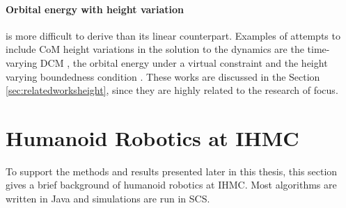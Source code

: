 \paragraph{Orbital energy with height variation}\label{subsec:nonorbit} is more difficult to derive than its linear counterpart.  Examples of attempts to include \ac{CoM} height variations in the solution to the dynamics are the time-varying \ac{DCM} \cite{hopkins2014humanoid}, the orbital energy under a virtual constraint \cite{pratt2007derivation} and the height varying boundedness condition \cite{caron2018balance}. These works are discussed in the Section 
\ref{sec:relatedworksheight}, since they are highly related to the research of focus.

\section{Humanoid Robotics at IHMC}\label{sec:ihmc}
To support the methods and results presented later in this thesis, this section gives a brief background of humanoid robotics at \ac{IHMC}. Most algorithms are written in Java and simulations are run in \ac{SCS}.
